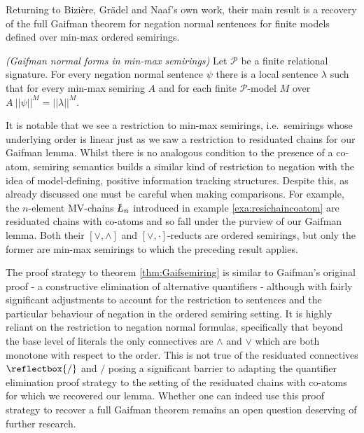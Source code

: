 \documentclass{lmcs} %
\newcommand{\?}{\ensuremath{\mkern0.4\thinmuskip}}
\newcommand{\Luk}{\text{\textsl{\L}}}%
\newcommand{\und}{\mathord{\reflectbox{/}}}%
\newcommand{\CP}{\mathcal{P}}
\begin{document}
Returning to Bizi\`{e}re, Gr\"{a}del and Naaf's own work, their main result is a recovery of the full Gaifman theorem for negation normal sentences for finite models defined over min-max ordered semirings.
\begin{thmC}\label{thm:Gaifsemiring}
\emph{(Gaifman normal forms in min-max semirings)} Let $\CP$ be a finite relational signature. For every negation normal sentence $\psi$ there is a local sentence $\lambda$ such that for every min-max semiring $A$ and for each finite $\CP$-model $M$ over $A\ ||\psi||^M=||\lambda||^M$.   
\end{thmC}
\noindent
It is notable that we see a restriction to min-max semirings, i.e.\ semirings whose underlying order is linear just as we saw a restriction to residuated chains for our Gaifman lemma. Whilst there is no analogous condition to the presence of a co-atom, semiring semantics builds a similar kind of restriction to negation with the idea of model-defining, positive information tracking structures. Despite this, as already discussed one must be careful when making comparisons. For example, the $n$-element MV-chains $\Luk_n$ introduced in example \ref{exa:resichaincoatom} are residuated chains with co-atoms and so fall under the purview of our Gaifman lemma. Both their $[\lor,\land]$ and $[\lor,\cdot]$-reducts are ordered semirings, but only the former are min-max semirings to which the preceding result applies.

The proof strategy to theorem \ref{thm:Gaifsemiring} is similar to Gaifman's original proof - a constructive elimination of alternative quantifiers - although with fairly significant adjustments to account for the restriction to sentences and the particular behaviour of negation in the ordered semiring setting. It is highly reliant on the restriction to negation normal formulas, specifically that beyond the base level of literals the only connectives are $\land$ and $\lor$ which are both monotone with respect to the order. This is not true of the residuated connectives $\und$ and $/$ posing a significant barrier to adapting the quantifier elimination proof strategy to the setting of the residuated chains with co-atoms for which we recovered our lemma. Whether one can indeed use this proof strategy to recover a full Gaifman theorem remains an open question deserving of further research.

\end{document}
